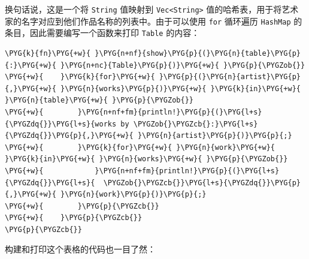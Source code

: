 换句话说，这是一个将 \texttt{String} 值映射到 \texttt{Vec<String>} 值的哈希表，用于将艺术家的名字对应到他们作品名称的列表中。由于可以使用 \texttt{for} 循环遍历 \texttt{HashMap} 的条目，因此需要编写一个函数来打印 \texttt{Table} 的内容：

\begin{Verbatim}[commandchars=\\\{\},breaklines=true,breakanywhere=true,fontsize=\codefont,xleftmargin=17bp]
\PYG{k}{fn}\PYG{+w}{ }\PYG{n+nf}{show}\PYG{p}{(}\PYG{n}{table}\PYG{p}{:}\PYG{+w}{ }\PYG{n+nc}{Table}\PYG{p}{)}\PYG{+w}{ }\PYG{p}{\PYGZob{}}
\PYG{+w}{    }\PYG{k}{for}\PYG{+w}{ }\PYG{p}{(}\PYG{n}{artist}\PYG{p}{,}\PYG{+w}{ }\PYG{n}{works}\PYG{p}{)}\PYG{+w}{ }\PYG{k}{in}\PYG{+w}{ }\PYG{n}{table}\PYG{+w}{ }\PYG{p}{\PYGZob{}}
\PYG{+w}{        }\PYG{n+nf+fm}{println!}\PYG{p}{(}\PYG{l+s}{\PYGZdq{}}\PYG{l+s}{works by \PYGZob{}\PYGZcb{}:}\PYG{l+s}{\PYGZdq{}}\PYG{p}{,}\PYG{+w}{ }\PYG{n}{artist}\PYG{p}{)}\PYG{p}{;}
\PYG{+w}{        }\PYG{k}{for}\PYG{+w}{ }\PYG{n}{work}\PYG{+w}{ }\PYG{k}{in}\PYG{+w}{ }\PYG{n}{works}\PYG{+w}{ }\PYG{p}{\PYGZob{}}
\PYG{+w}{            }\PYG{n+nf+fm}{println!}\PYG{p}{(}\PYG{l+s}{\PYGZdq{}}\PYG{l+s}{  \PYGZob{}\PYGZcb{}}\PYG{l+s}{\PYGZdq{}}\PYG{p}{,}\PYG{+w}{ }\PYG{n}{work}\PYG{p}{)}\PYG{p}{;}
\PYG{+w}{        }\PYG{p}{\PYGZcb{}}
\PYG{+w}{    }\PYG{p}{\PYGZcb{}}
\PYG{p}{\PYGZcb{}}
\end{Verbatim}

构建和打印这个表格的代码也一目了然：


